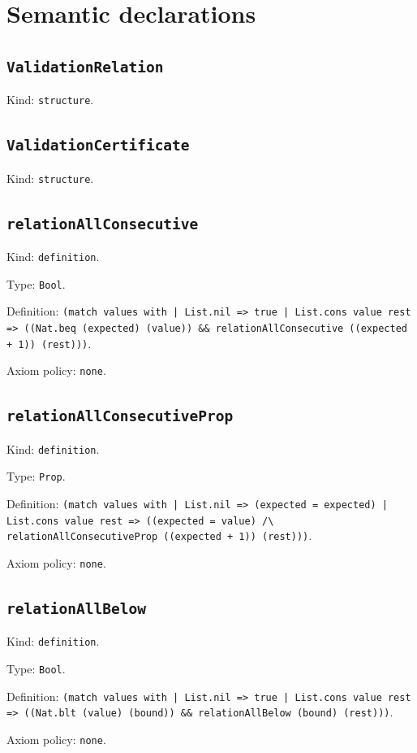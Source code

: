 \documentclass[11pt]{article}
\begin{document}
\section*{Semantic declarations}
\subsection*{\texttt{ValidationRelation}}
\noindent Kind: \texttt{structure}.\par
\subsection*{\texttt{ValidationCertificate}}
\noindent Kind: \texttt{structure}.\par
\subsection*{\texttt{relationAllConsecutive}}
\noindent Kind: \texttt{definition}.\par
\noindent Type: \texttt{Bool}.\par
\noindent Definition: \texttt{(match values with | List.nil => true | List.cons value rest => ((Nat.beq (expected) (value)) \&\& relationAllConsecutive ((expected + 1)) (rest)))}.\par
\noindent Axiom policy: \texttt{none}.\par
\subsection*{\texttt{relationAllConsecutiveProp}}
\noindent Kind: \texttt{definition}.\par
\noindent Type: \texttt{Prop}.\par
\noindent Definition: \texttt{(match values with | List.nil => (expected = expected) | List.cons value rest => ((expected = value) /\textbackslash{} relationAllConsecutiveProp ((expected + 1)) (rest)))}.\par
\noindent Axiom policy: \texttt{none}.\par
\subsection*{\texttt{relationAllBelow}}
\noindent Kind: \texttt{definition}.\par
\noindent Type: \texttt{Bool}.\par
\noindent Definition: \texttt{(match values with | List.nil => true | List.cons value rest => ((Nat.blt (value) (bound)) \&\& relationAllBelow (bound) (rest)))}.\par
\noindent Axiom policy: \texttt{none}.\par
\end{document}
